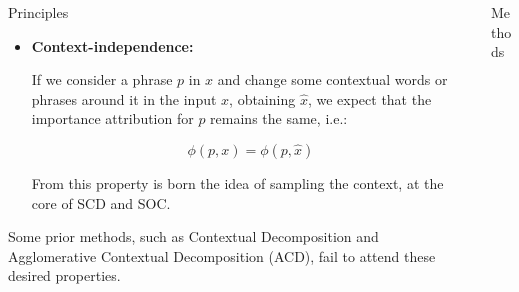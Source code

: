\documentclass[final]{beamer}
\newlength{\onecolwid}
\newlength{\twocolwid}
\begin{document}
\begin{frame}[t]
\begin{columns}[t]
\begin{column}{\twocolwid}
\begin{columns}[t,totalwidth=\twocolwid]
\begin{column}{\onecolwid}
\begin{block}{Principles}
\begin{itemize}
    \begin{equation}
        \phi(p, x) \neq \sum _{x_i \in p} \phi(x_i, x) 
    \end{equation}
    
    \item \textbf{Context-independence:}
    
    
    
    If we consider a phrase $p$ in $x$ and change some contextual words or phrases around it in the input $x$, obtaining $\hat{x}$, we expect that the importance attribution for $p$ remains the same, i.e.:
    
    \begin{equation}
        \phi(p, x) = \phi(p, \hat{x}) 
    \end{equation}
    
    From this property is born the idea of sampling the context, at the core of SCD and SOC.
\end{itemize}

Some prior methods, such as Contextual Decomposition and Agglomerative Contextual Decomposition (ACD), fail to attend these desired properties.



\end{block}

\end{column} %
\begin{column}{\onecolwid}\vspace{-.6in} %
\begin{block}{Methods}


\end{block}
\end{column}
\end{columns}
\end{column}
\end{columns}
\end{frame}
\end{document}

